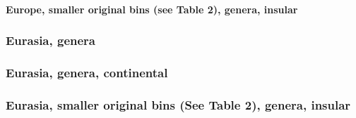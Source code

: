 \documentclass[]{article}
\let\oldparagraph\paragraph
\renewcommand{\paragraph}[1]{\oldparagraph{#1}\mbox{}}
\begin{document}
\newpage

\paragraph{Europe, smaller original bins (see Table 2), genera,
insular}\label{europe-smaller-original-bins-see-table-2-genera-insular}

\newpage 

\subsubsection{Eurasia, genera}\label{eurasia-genera}

\newpage 

\subsubsection{Eurasia, genera,
continental}\label{eurasia-genera-continental}

\newpage 

\subsubsection{Eurasia, smaller original bins (See Table 2), genera,
insular}\label{eurasia-smaller-original-bins-see-table-2-genera-insular}
\end{document}
